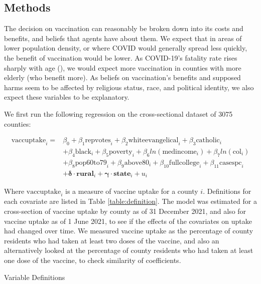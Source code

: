 \documentclass[12pt]{article}
\begin{document}
\begin{spacing}{1.5}
		\subsection{Methods}
		The decision on vaccination can reasonably be broken down into its costs and benefits, and beliefs that agents have about them. We expect that in areas of lower population density, or where COVID would generally spread less quickly, the benefit of vaccination would be lower. As COVID-19's fatality rate rises sharply with age (\cite{levin_assessing_2020}), we would expect more vaccination in counties with more elderly (who benefit more). As beliefs on vaccination's benefits and supposed harms seem to be affected by religious status, race, and political identity, we also expect these variables to be explanatory.
		
		We first run the following regression on the cross-sectional dataset of 3075 counties:
		
		\begin{equation} \label{eq:crosssection}
			\begin{split}
				\textrm{vaccuptake}_i = &\beta_0 + \beta_1 \textrm{repvotes}_i + \beta_2 \textrm{whiteevangelical}_i + \beta_3 \textrm{catholic}_i \\ 
				&+ \beta_4 \textrm{black}_i + \beta_5 \textrm{poverty}_i + \beta_6 ln(\textrm{medincome}_i) + \beta_7 ln(\textrm{col}_i) \\ 
				&+ \beta_8 \textrm{pop60to79}_i + \beta_9 \textrm{above80}_i + \beta_{10} \textrm{fullcollege}_i + \beta_{11} \textrm{casespc}_i \\
				&+\boldsymbol{\delta}\cdot \mathbf{rural}_i + \boldsymbol{\gamma}\cdot \mathbf{state}_i + u_i
			\end{split}
		\end{equation}
		
		Where $\textrm{vaccuptake}_i$ is a measure of vaccine uptake for a county $i$. Definitions for each covariate are listed in Table \ref{table:definition}. The model was estimated for a cross-section of vaccine uptake by county as of 31 December 2021, and also for vaccine uptake as of 1 June 2021, to see if the effects of the covariates on uptake had changed over time. We measured vaccine uptake as the percentage of county residents who had taken at least two doses of the vaccine, and also an alternatively looked at the percentage of county residents who had taken at least one dose of the vaccine, to check similarity of coefficients.
		
		\begin{table}
			\caption{Variable Definitions}
			
			\label{table:definition}
		\end{table}
	

\end{spacing}
\end{document}
